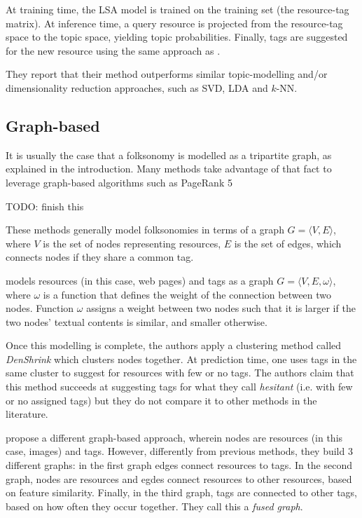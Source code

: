 At training time, the LSA model is trained on the training set (the resource-tag matrix). At inference time, a query resource is projected from the resource-tag space to the topic space, yielding topic probabilities. Finally, tags are suggested for the new resource using the same approach as \cite{si_sun_2008}.

They report that their method outperforms similar topic-modelling and/or dimensionality reduction approaches, such as SVD, LDA and $k$-NN.

\subsection{Graph-based}

It is usually the case that a folksonomy is modelled as a tripartite graph, as explained in the introduction. Many methods take advantage of that fact to leverage graph-based algorithms such as PageRank 5

{\color{red} TODO: finish this}

These methods generally model folksonomies in terms of a graph $G=\langle V,E \rangle$, where $V$ is the set of nodes representing resources, $E$ is the set of edges, which connects nodes if they share a common tag.

\cite{wang_etal_2015} models resources (in this case, web pages) and tags as a graph $G=\langle V,E,\omega \rangle$, where $\omega$ is a function that defines the weight of the connection between two nodes. Function $\omega$ assigns a weight between two nodes such that it is larger if the two nodes' textual contents is similar, and smaller otherwise.

Once this modelling is complete, the authors apply a clustering method called \textit{DenShrink} \citep{huang_etal_2011} which clusters nodes together. At prediction time, one uses tags in the same cluster to suggest for resources with few or no tags. The authors claim that this method succeeds at suggesting tags for what they call \textit{hesitant} (i.e. with few or no assigned tags) but they do not compare it to other methods in the literature.

\cite{kakade_kakade_2013} propose a different graph-based approach, wherein nodes are resources (in this case, images) and tags. However, differently from previous methods, they build 3 different graphs: in the first graph edges connect resources to tags. In the second graph, nodes are resources and egdes connect resources to other resources, based on feature similarity. Finally, in the third graph, tags are connected to other tags, based on how often they occur together. They call this a \textit{fused graph}.

